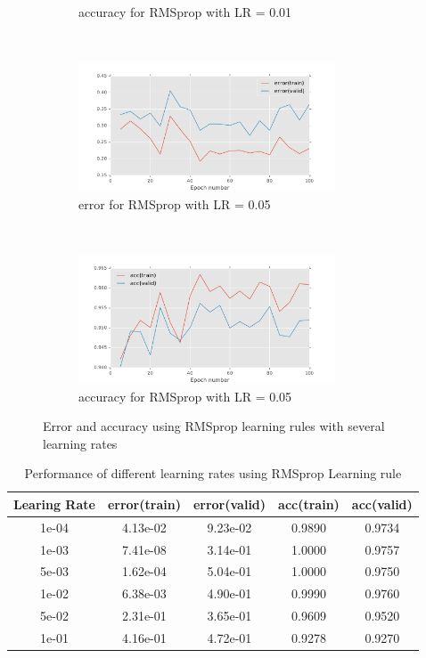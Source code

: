 \documentclass[11pt]{article}
\begin{document}
\begin{figure}[t!]
\begin{subfigure}[t]{0.45\textwidth}
        \caption{accuracy for RMSprop with LR = 0.01}
    \end{subfigure}    
	~
    \begin{subfigure}[t]{0.45\textwidth}
        \centering
        \includegraphics[height=1.5in]{error_with_RMSprop_0_05.pdf}
        \caption{error for RMSprop with LR = 0.05}
    \end{subfigure}   
    ~
    \begin{subfigure}[t]{0.45\textwidth}
        \centering
        \includegraphics[height=1.5in]{acc_with_RMSprop_0_05.pdf}
        \caption{accuracy for RMSprop with LR = 0.05}
    \end{subfigure}       
    \caption{Error and accuracy using RMSprop learning rules with several learning rates}    
    \label{fig:rms}
\end{figure}

\begin{table}
\begin{center}
\begin{tabular}{ c c c c c} 
\hline
Learing Rate & error(train) & error(valid) & acc(train) & acc(valid)\\
\hline
\hline
1e-04 & 4.13e-02 & 9.23e-02 & 0.9890 & 0.9734 \\ 
1e-03 & 7.41e-08 & 3.14e-01 & 1.0000 & 0.9757 \\ 
5e-03 & 1.62e-04 & 5.04e-01 & 1.0000 & 0.9750 \\ 
1e-02  &  6.38e-03 & 4.90e-01 & 0.9990 & 0.9760 \\
5e-02  &  2.31e-01 & 3.65e-01 & 0.9609 & 0.9520 \\
1e-01  &  4.16e-01 & 4.72e-01 & 0.9278 & 0.9270 \\
\end{tabular}
\caption{Performance of different learning rates using RMSprop Learning rule}
\label{tb:rms}
\end{center}	
\end{table}
\end{document}
